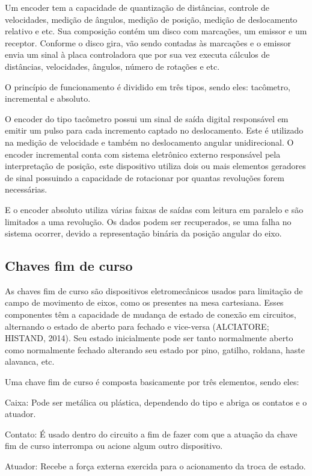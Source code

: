 Um encoder tem a capacidade de quantização de distâncias, controle de velocidades, medição de ângulos, 
medição de posição, medição de deslocamento relativo e etc. Sua composição contém um disco com marcações, 
um emissor e um receptor. Conforme o disco gira, vão sendo contadas às marcações e o emissor envia um sinal 
à placa controladora que por sua vez executa cálculos de distâncias, velocidades, ângulos, número de rotações 
e etc.

O princípio de funcionamento é dividido em três tipos, sendo eles: tacômetro, incremental e absoluto.

O encoder do tipo tacômetro possui um sinal de saída digital responsável em emitir um pulso para cada 
incremento captado no deslocamento. Este é utilizado na medição de velocidade e também no deslocamento 
angular unidirecional. O encoder incremental conta com sistema eletrônico externo responsável pela 
interpretação de posição, este dispositivo utiliza dois ou mais elementos geradores de sinal possuindo 
a capacidade de rotacionar por quantas revoluções forem necessárias.

E o encoder absoluto utiliza várias faixas de saídas com leitura em paralelo e são limitados a uma revolução. 
Os dados podem ser recuperados, se uma falha no sistema ocorrer, devido a representação binária da posição 
angular do eixo.

\subsection{Chaves fim de curso}\label{subsec:metchaves}

As chaves fim de curso são dispositivos eletromecânicos usados para limitação de campo de movimento de eixos, 
como os presentes na mesa cartesiana. Esses componentes têm a capacidade de mudança de estado de conexão 
em circuitos, alternando o estado de aberto para fechado e vice-versa (ALCIATORE; HISTAND, 2014). 
Seu estado inicialmente pode ser tanto normalmente aberto como normalmente fechado alterando seu estado 
por pino, gatilho, roldana, haste alavanca, etc. 

Uma chave fim de curso é composta basicamente por três elementos, sendo eles:

\begin{alineas}
    \item Caixa: Pode ser metálica ou plástica, dependendo do tipo e abriga os contatos e o atuador.
    \item Contato: É usado dentro do circuito a fim de fazer com que a atuação da chave fim de curso interrompa ou 
    acione algum outro dispositivo.
    \item Atuador: Recebe a força externa exercida para o acionamento da troca de estado.
\end{alineas}

